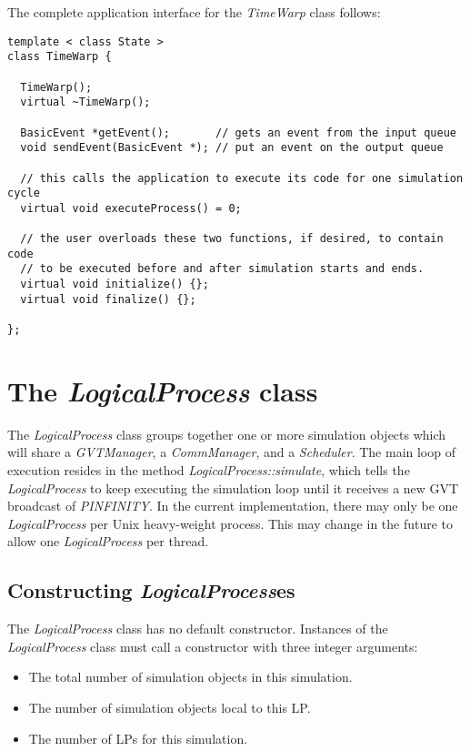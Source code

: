 \documentclass[11pt]{report}
\begin{document}
The complete application interface for the {\it TimeWarp} class
follows:

\begin{verbatim}
template < class State > 
class TimeWarp {

  TimeWarp();
  virtual ~TimeWarp();

  BasicEvent *getEvent();       // gets an event from the input queue
  void sendEvent(BasicEvent *); // put an event on the output queue

  // this calls the application to execute its code for one simulation cycle
  virtual void executeProcess() = 0;
  
  // the user overloads these two functions, if desired, to contain code
  // to be executed before and after simulation starts and ends.
  virtual void initialize() {};
  virtual void finalize() {};

};

\end{verbatim}

\section{The {\it LogicalProcess} class}

The {\it LogicalProcess} class groups together one or more simulation
objects which will share a {\it GVTManager}, a {\it CommManager}, and a
{\it Scheduler}.  The main loop of execution resides in the method {\it
LogicalProcess::simulate}, which tells the {\it LogicalProcess} to keep
executing the simulation loop until it receives a new GVT broadcast of
{\it PINFINITY}.  In the current implementation, there may only be one
{\it LogicalProcess} per Unix heavy-weight process.  This may change in
the future to allow one {\it LogicalProcess} per thread.

\subsection{Constructing {\it LogicalProcess}es}

The {\it LogicalProcess} class has no default constructor.  Instances of
the {\it LogicalProcess} class must call a constructor with three integer
arguments:

\begin{itemize}
\item
The total number of simulation objects in this simulation.
\item
The number of simulation objects local to this LP.
\item
The number of LPs for this simulation.
\end{itemize}
\end{document}
